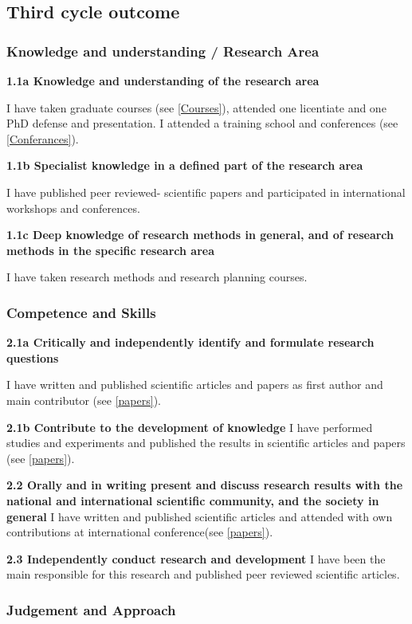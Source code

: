 \subsection{Third cycle outcome}

\subsubsection{Knowledge and understanding / Research Area}
 \textbf{1.1a Knowledge and understanding of the research area}

I have taken graduate courses (see \ref{Courses}), attended one licentiate and one PhD defense and presentation. I attended a training school and conferences (see \ref{Conferances}).

 \textbf{1.1b Specialist knowledge in a defined part of the research area}
 
 I have published peer reviewed- scientific papers and participated in international workshops and conferences.
 
 \textbf{1.1c Deep knowledge of research methods in general, and of research methods in the specific research area}

I have taken research methods and research planning courses.

\subsubsection{Competence and Skills}
\textbf{2.1a Critically and independently identify and formulate research questions}

I have written and published scientific articles and papers as first author and main contributor (see \ref{papers}).

\textbf{2.1b Contribute to the development of knowledge}
I have performed studies and experiments and published the results in scientific articles and papers (see \ref{papers}).

\textbf{2.2 Orally and in writing present and discuss research results with the national and international scientific community, and the society in general}
I have written and published scientific articles and attended with own contributions at international conference(see \ref{papers}).

\textbf{2.3 Independently conduct research and development}
I have been the main responsible for this research and published peer reviewed scientific articles. 

\subsubsection{Judgement and Approach}


